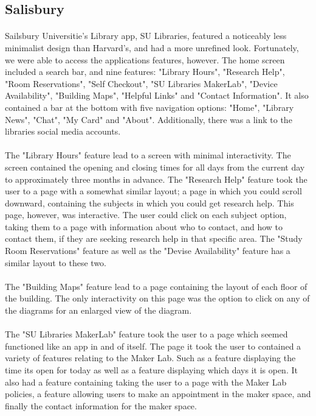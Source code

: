         \subsection{Salisbury}
            \paragraph{}
            Sailsbury Universitie's Library app, SU Libraries, featured a noticeably less minimalist design than Harvard's, and had a more unrefined look.  Fortunately, we were able to access the applications features, however. The home screen included a search bar, and nine features: "Library Hours", "Research Help", "Room Reservations", "Self Checkout", "SU Libraries MakerLab", "Device Availability", "Building Maps", "Helpful Links" and "Contact Information". It also contained a bar at the bottom with five navigation options: "Home", "Library News", "Chat", "My Card" and "About". Additionally, there was a link to the libraries social media accounts.
            \paragraph{}
            The "Library Hours" feature lead to a screen with minimal interactivity. The screen contained the opening and closing times for all days from the current day to approximately three months in advance. The "Research Help" feature took the user to a page with a somewhat similar layout; a page in which you could scroll downward, containing the subjects in which you could get research help. This page, however, was interactive. The user could click on each subject option, taking them to a page with information about who to contact, and how to contact them, if they are seeking research help in that specific area.  The "Study Room Reservations" feature as well as the "Devise Availability" feature has a similar layout to these two.
            \paragraph{}
            The "Building Maps" feature lead to a page containing the layout of each floor of the building. The only interactivity on this page was the option to click on any of the diagrams for an enlarged view of the diagram. 
            \paragraph{}
            The "SU Libraries MakerLab" feature took the user to a page which seemed functioned like an app in and of itself. The page it took the user to contained a variety of features relating to the Maker Lab. Such as a feature displaying the time its open for today as well as a feature displaying which days it is open. It also had a feature containing taking the user to a page with the Maker Lab policies, a feature allowing users to make an appointment in the maker space, and finally the contact information for the maker space. 